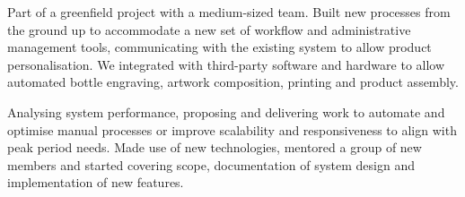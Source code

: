 \cventrycont
    {\begin{cvitems}
        \item{Part of a greenfield project with a medium-sized team. Built new processes from the ground up 
        to accommodate a new set of workflow and administrative management tools, communicating with the existing 
        system to allow product personalisation. We integrated with third-party software and hardware to allow 
        automated bottle engraving, artwork composition, printing and product assembly.}
        \item{Analysing system performance, proposing and delivering work to automate and optimise manual
         processes or improve scalability and responsiveness to align with peak period needs. Made use of 
         new technologies, mentored a group of new members and started covering scope, documentation of system 
         design and implementation of new features.}
    \end{cvitems}}